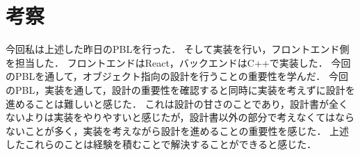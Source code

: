 \documentclass{ltjsarticle}
\begin{document}
\section{考察}
今回私は上述した昨日のPBLを行った．
そして実装を行い，フロントエンド側を担当した．
フロントエンドはReact，バックエンドはC++で実装した．
今回のPBLを通して，オブジェクト指向の設計を行うことの重要性を学んだ．
今回のPBL，実装を通して，設計の重要性を確認すると同時に実装を考えずに設計を進めることは難しいと感じた．
これは設計の甘さのことであり，設計書が全くないよりは実装をやりやすいと感じたが，設計書以外の部分で考えなくてはならないことが多く，実装を考えながら設計を進めることの重要性を感じた．
上述したこれらのことは経験を積むことで解決することができると感じた．
\end{document}

